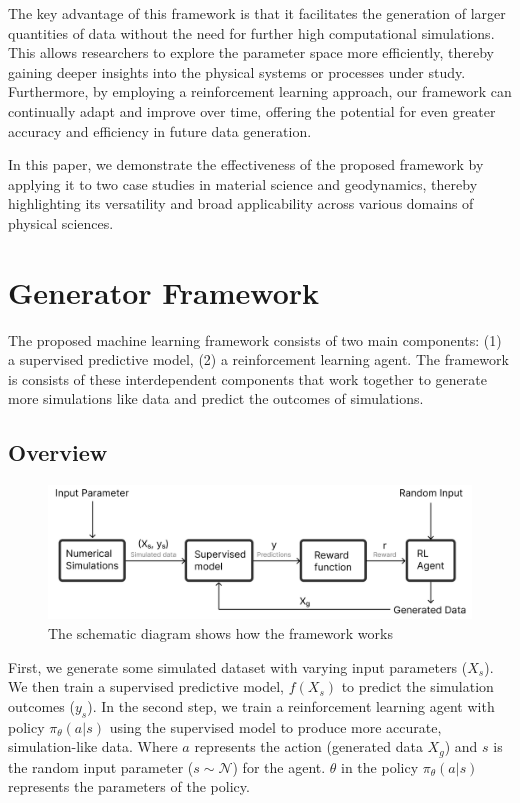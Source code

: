 \documentclass{article}
\begin{document}
The key advantage of this framework is that it facilitates the generation of larger quantities of data without the need for further high computational simulations. This allows researchers to explore the parameter space more efficiently, thereby gaining deeper insights into the physical systems or processes under study. Furthermore, by employing a reinforcement learning approach, our framework can continually adapt and improve over time, offering the potential for even greater accuracy and efficiency in future data generation.

In this paper, we demonstrate the effectiveness of the proposed framework by applying it to two case studies in material science and geodynamics, thereby highlighting its versatility and broad applicability across various domains of physical sciences.

\section{Generator Framework}

The proposed machine learning framework consists of two main components: (1) a supervised predictive model, (2) a reinforcement learning agent. The framework is consists of these interdependent components that work together to generate more simulations like data and predict the outcomes of simulations.

\subsection{Overview}

\begin{figure}[!h]
    \begin{center}
        \includegraphics[scale=0.60]{figures/framework.png}
    \end{center}
    \caption{The schematic diagram shows how the framework works}
    \label{fig:bnn-diagram}
\end{figure}


First, we generate some simulated dataset with varying input parameters ($X_s$). We then train a supervised predictive model, $f(X_s)$ to predict the simulation outcomes ($y_s$). In the second step, we train a reinforcement learning agent with policy $\pi_{\theta}(a|s)$ using the supervised model to produce more accurate, simulation-like data. Where $a$ represents the action (generated data $X_g$) and $s$ is the random input parameter ($s\sim \mathcal{N}$) for the agent. $\theta$ in the policy $\pi_{\theta}(a|s)$ represents the parameters of the policy.
\end{document}
